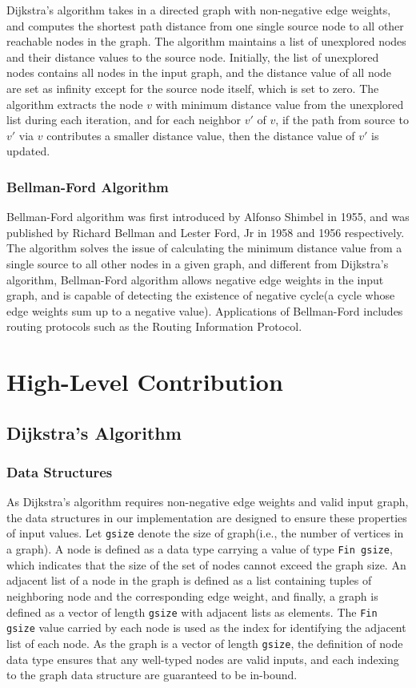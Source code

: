 \documentclass[11pt, a4paper]{article} %
\theoremstyle{definition}
\begin{document}
Dijkstra's algorithm takes in a directed graph with non-negative edge weights, and computes the shortest path distance from one single source node to all other reachable nodes in the graph. The algorithm maintains a list of unexplored nodes and their distance values to the source node. Initially, the list of unexplored nodes contains all nodes in the input graph, and the distance value of all node are set as infinity except for the source node itself, which is set to zero. The algorithm extracts the node $v$ with minimum distance value from the unexplored list during each iteration, and for each neighbor $v'$ of $v$, if the path from source to $v'$ via $v$ contributes a smaller distance value, then the distance value of $v'$ is updated. 

\subsubsection*{Bellman-Ford Algorithm}
Bellman-Ford algorithm was first introduced by Alfonso Shimbel in 1955, and was published by Richard Bellman and Lester Ford, Jr in 1958 and 1956 respectively. The algorithm solves the issue of calculating the minimum distance value from a single source to all other nodes in a given graph, and different from Dijkstra's algorithm, Bellman-Ford algorithm allows negative edge weights in the input graph, and is capable of detecting the existence of negative cycle(a cycle whose edge weights sum up to a negative value). Applications of Bellman-Ford includes routing protocols such as the Routing Information Protocol. 

\section{High-Level Contribution}
\subsection{Dijkstra's Algorithm}
\subsubsection{Data Structures}
As Dijkstra's algorithm requires non-negative edge weights and valid input graph, the data structures in our implementation are designed to ensure these properties of input values. Let \texttt{gsize} denote the size of graph(i.e., the number of vertices in a graph). A node is defined as a data type carrying a value of type \texttt{Fin gsize}, which indicates that the size of the set of nodes cannot exceed the graph size. An adjacent list of a node in the graph is defined as a list containing tuples of neighboring node and the corresponding edge weight, and finally, a graph is defined as a vector of length \texttt{gsize} with adjacent lists as elements. The \texttt{Fin gsize} value carried by each node is used as the index for identifying the adjacent list of each node. As the graph is a vector of length \texttt{gsize}, the definition of node data type ensures that any well-typed nodes are valid inputs, and each indexing to the graph data structure are guaranteed to be in-bound. 
\end{document}
